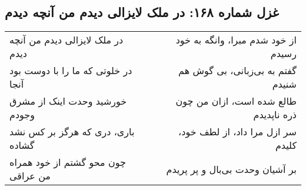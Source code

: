 \begin{center}
\section*{غزل شماره ۱۶۸: در ملک لایزالی دیدم من آنچه دیدم}
\label{sec:168}
\begin{longtable}{l p{0.5cm} r}
در ملک لایزالی دیدم من آنچه دیدم
&&
از خود شدم مبرا، وانگه به خود رسیدم
\\
در خلوتی که ما را با دوست بود آنجا
&&
گفتم به بی‌زبانی، بی گوش هم شنیدم
\\
خورشید وحدت اینک از مشرق وجودم
&&
طالع شده است، ازان من چون ذره ناپدیدم
\\
باری، دری که هرگز بر کس نشد گشاده
&&
سر ازل مرا داد، از لطف خود، کلیدم
\\
چون محو گشتم از خود همراه من عراقی
&&
بر آشیان وحدت بی‌بال و پر پریدم
\\
\end{longtable}
\end{center}
